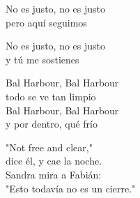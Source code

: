 \begin{lyrics}
No es justo, no es justo\\
pero aquí seguimos

No es justo, no es justo\\
y tú me sostienes

Bal Harbour, Bal Harbour\\
todo se ve tan limpio\\
Bal Harbour, Bal Harbour\\
y por dentro, qué frío

"Not free and clear,"\\
dice él, y cae la noche.\\
Sandra mira a Fabián:\\
"Esto todavía no es un cierre."

\end{lyrics}

